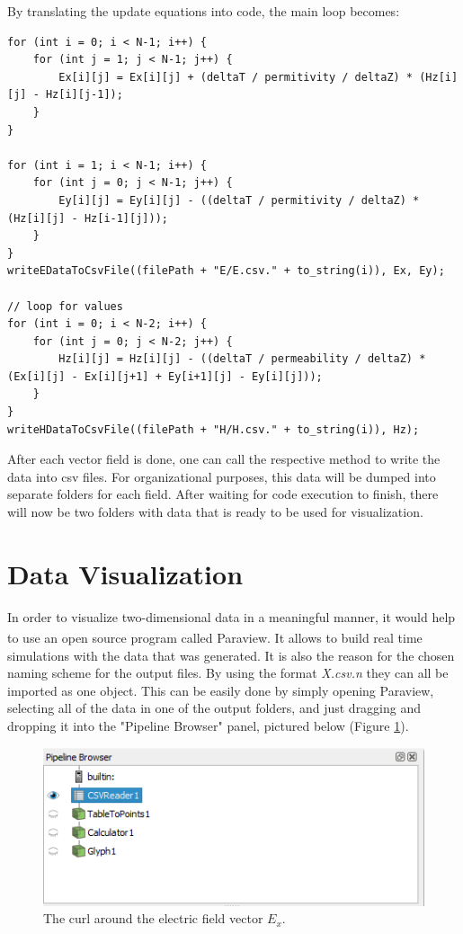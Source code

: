 By translating the update equations into code, the main loop becomes:

\begin{verbatim}
for (int i = 0; i < N-1; i++) {
	for (int j = 1; j < N-1; j++) {
		Ex[i][j] = Ex[i][j] + (deltaT / permitivity / deltaZ) * (Hz[i][j] - Hz[i][j-1]);
	}
}

for (int i = 1; i < N-1; i++) {
	for (int j = 0; j < N-1; j++) {
		Ey[i][j] = Ey[i][j] - ((deltaT / permitivity / deltaZ) * (Hz[i][j] - Hz[i-1][j]));
	}
}
writeEDataToCsvFile((filePath + "E/E.csv." + to_string(i)), Ex, Ey);

// loop for values
for (int i = 0; i < N-2; i++) {
	for (int j = 0; j < N-2; j++) {
		Hz[i][j] = Hz[i][j] - ((deltaT / permeability / deltaZ) * (Ex[i][j] - Ex[i][j+1] + Ey[i+1][j] - Ey[i][j]));
	}
}
writeHDataToCsvFile((filePath + "H/H.csv." + to_string(i)), Hz);
\end{verbatim}

After each vector field is done, one can call the respective method to write the data into csv files. For organizational purposes, this data will be dumped into separate folders for each field. After waiting for code execution to finish, there will now be two folders with data that is ready to be used for visualization.

\section{Data Visualization}

In order to visualize two-dimensional data in a meaningful manner, it would help to use an open source program called Paraview\textsuperscript{\cite{paraview}}. It allows to build real time simulations with the data that was generated. It is also the reason for the chosen naming scheme for the output files. By using the format \textit{X.csv.n} they can all be imported as one object. This can be easily done by simply opening Paraview, selecting all of the data in one of the output folders, and just dragging and dropping it into the "Pipeline Browser" panel, pictured below (Figure \ref{fig:paraviewFDTD2D1}).

\begin{figure}[h!]
	\centering
	\includegraphics[scale=0.6]{Figures/paraviewFDTD2D1}
	\decoRule
	\caption[2D TE Mode - $E_x$ vector curl]{The curl around the electric field vector $E_x$.}
	\label{fig:paraviewFDTD2D1}
\end{figure}

